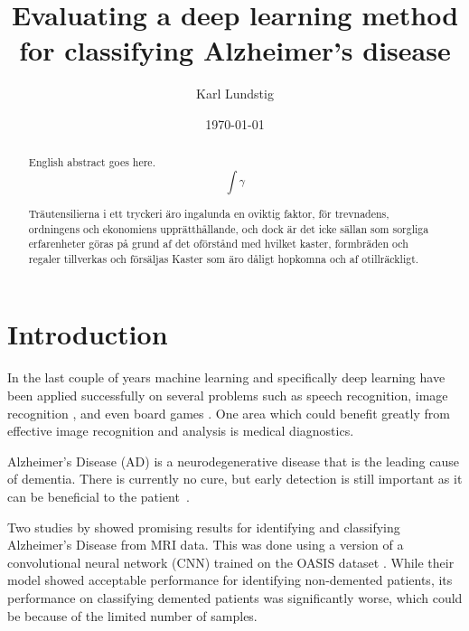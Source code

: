 \documentclass{kththesis}
\title{Evaluating a deep learning method for classifying Alzheimer's disease}
\author{Karl Lundstig}
\date{\today}
\begin{document}
\frontmatter

\titlepage

\begin{abstract}
  English abstract goes here.
  $$\int \gamma$$

\end{abstract}


\begin{otherlanguage}{swedish}
  \begin{abstract}
    Träutensilierna i ett tryckeri äro ingalunda en oviktig faktor,
    för trevnadens, ordningens och ekonomiens upprätthållande, och
    dock är det icke sällan som sorgliga erfarenheter göras på grund
    af det oförstånd med hvilket kaster, formbräden och regaler
    tillverkas och försäljas Kaster som äro dåligt hopkomna och af
    otillräckligt.
  \end{abstract}
\end{otherlanguage}


\tableofcontents


\mainmatter

\chapter{Introduction}

In the last couple of years machine learning and specifically deep learning have been applied successfully on several problems such as speech recognition, image recognition \parencite{krizhevsky2012imagenet}, and even board games \parencite{silver2018general}. One area which could benefit greatly from effective image recognition and analysis is medical diagnostics.

Alzheimer’s Disease (AD) is a neurodegenerative disease that is the leading cause of dementia. There is currently no cure, but early detection is still important as it can be beneficial to the patient~\cite{factsfigures2018}.

Two studies by \textcite{islam2017novel, islam2018early} showed promising results for identifying and classifying Alzheimer’s Disease from MRI data. This was done using a version of a convolutional neural network (CNN) trained on the OASIS dataset \parencite{marcus2010open}. While their model showed acceptable performance for identifying non-demented patients, its performance on classifying demented patients was significantly worse, which could be because of the limited number of samples. 
\end{document}
